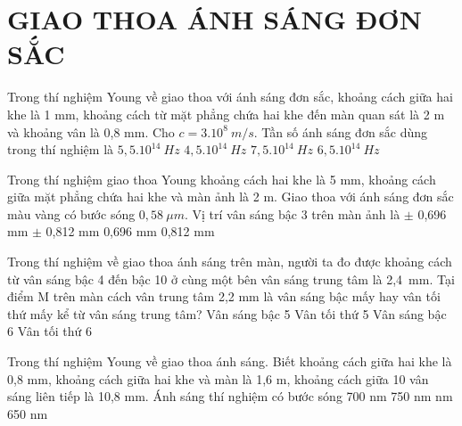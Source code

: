 \section{GIAO THOA ÁNH SÁNG ĐƠN SẮC}
\begin{ex}%
Trong thí nghiệm Young về giao thoa với ánh sáng đơn sắc, khoảng cách giữa hai khe là 1 mm, khoảng cách từ mặt phẳng chứa hai khe đến màn quan sát là 2 m và khoảng vân là 0,8 mm. Cho $c={{3. 10}^{8}}\ m/s $. Tần số ánh sáng đơn sắc dùng trong thí nghiệm là
\choice
{$5,{{5. 10}^{14}}\ Hz $}
{$4,{{5. 10}^{14}}\ Hz $}
{\True $7,{{5. 10}^{14}}\ Hz $}
{$6,{{5. 10}^{14}}\ Hz $}
\end{ex} 
\begin{ex}%
Trong thí nghiệm giao thoa Young khoảng cách hai khe là 5 mm, khoảng cách giữa mặt phẳng chứa hai khe và màn ảnh là 2 m. Giao thoa với ánh sáng đơn sắc màu vàng có bước sóng $0,58\ \mu m$. Vị trí vân sáng bậc 3 trên màn ảnh là
\choice
{\True $ \pm $ 0,696 mm}
{$ \pm $ 0,812 mm}
{0,696 mm}
{0,812 mm}
\end{ex} 
\begin{ex}%
Trong thí nghiệm về giao thoa ánh sáng trên màn, người ta đo được khoảng cách từ vân sáng bậc 4 đến bậc 10 ở cùng một bên vân sáng trung tâm là 2,4\ mm. Tại điểm M trên màn cách vân trung tâm 2,2 mm là vân sáng bậc mấy hay vân tối thứ mấy kể từ vân sáng trung tâm?
\choice
{Vân sáng bậc 5}
{Vân tối thứ 5}
{Vân sáng bậc 6}
{\True Vân tối thứ 6}
\end{ex} 
\begin{ex}%
Trong thí nghiệm Young về giao thoa ánh sáng. Biết khoảng cách giữa hai khe là 0,8 mm, khoảng cách giữa hai khe và màn là 1,6 m, khoảng cách giữa 10 vân sáng liên tiếp là 10,8 mm. Ánh sáng thí nghiệm có bước sóng
\choice
{700 nm}
{750 nm}
{ nm}
{650 nm}
\end{ex} 
